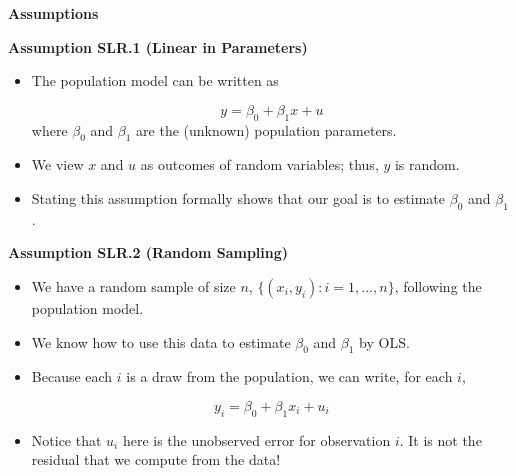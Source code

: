 \documentclass[notes=show]{beamer}
\begin{document}
\begin{frame}[plain]

\begin{center}
\textbf{Assumptions}
\end{center}

\end{frame}

\begin{frame}[plain]

 \textbf{Assumption SLR.1 (Linear in Parameters)}
 \begin{itemize}
  \item The population model can be written as

  \begin{equation}
   y=\beta _{0}+\beta _{1}x+u
  \end{equation}
  where $\beta _{0}$ and $\beta _{1}$ are the (unknown) population parameters.

  \item We view $x$ and $u$ as outcomes of random variables; thus, $y$ is random.

  \item Stating this assumption formally shows that our goal is to estimate $\beta _{0}$ and $\beta _{1}$.
 \end{itemize}
\end{frame}

\begin{frame}[plain]

\textbf{Assumption SLR.2 (Random Sampling)}

 \begin{itemize}
  \item We have a random sample of size $n$, $\{(x_{i},y_{i}):i=1,...,n\}$, following the population model.

  \item We know how to use this data to estimate $\beta _{0}$ and $\beta _{1}$ by OLS.

  \item Because each $i$ is a draw from the population, we can write, for each $i$,

   \begin{equation}
    y_{i}=\beta _{0}+\beta _{1}x_{i}+u_{i}
   \end{equation}
  
  \item Notice that $u_{i}$ here is the unobserved error for observation $i$. It is not the residual that we compute from the data!

 \end{itemize}
\end{frame}
\end{document}
